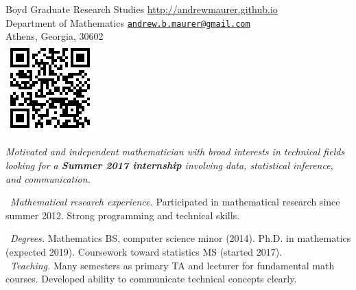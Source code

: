 \documentclass[10pt,a4paper]{article}
\begin{document}
\sloppy  %



\spacedhrule{0.9em}{-0.4em}  %


\noindent
Boyd Graduate Research Studies\tabto{7cm} \url{http://andrewmaurer.github.io} \\
Department of Mathematics \tabto{7cm} \href{mailto:andrew.b.maurer@gmail.com}{\texttt{andrew.b.maurer@gmail.com}} \\
Athens, Georgia, 30602 \ \\
\tabto{14.5cm}\includegraphics[scale=.5]{qr.png}\\

\spacedhrule{-.5em}{-.4em}


\vspace{-1.3em}  %
\begin{multicols}{2}  %
\noindent \emph{Motivated and independent mathematician with broad interests in technical fields looking for a \textbf{Summer 2017 internship} involving data, statistical inference, and communication.}

\textbullet~\textit{Mathematical research experience.} Participated in mathematical research since summer 2012. Strong programming and technical skills.

\textbullet~\textit{Degrees.} Mathematics BS, computer science minor (2014). Ph.D. in mathematics (expected 2019). Coursework toward statistics MS (started 2017).
\\
\indent~\textbullet \textit{Teaching.} Many semesters as primary TA and lecturer for fundamental math courses. Developed ability to communicate technical concepts clearly.
\end{multicols}

\spacedhrule{0em}{-.04em}
\end{document}
